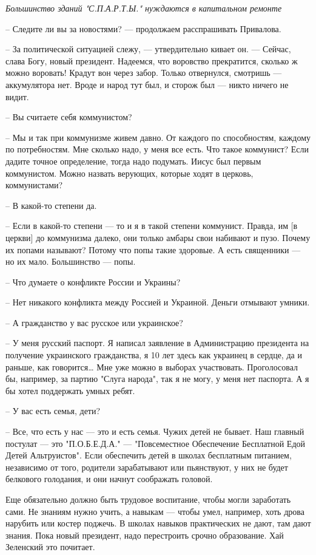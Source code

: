 \emph{Большинство зданий "С.П.А.Р.Т.Ы." нуждаются в капитальном ремонте}

– Следите ли вы за новостями? --- продолжаем расспрашивать Привалова.

– За политической ситуацией слежу, --- утвердительно кивает он. --- Сейчас, слава
Богу, новый президент. Надеемся, что воровство прекратится, сколько ж можно
воровать! Крадут вон через забор. Только отвернулся, смотришь --- аккумулятора
нет. Вроде и народ тут был, и сторож был --- никто ничего не видит.

– Вы считаете себя коммунистом?

– Мы и так при коммунизме живем давно. От каждого по способностям, каждому по
потребностям. Мне сколько надо, у меня все есть. Что такое коммунист? Если
дадите точное определение, тогда надо подумать. Иисус был первым коммунистом.
Можно назвать верующих, которые ходят в церковь, коммунистами?

– В какой-то степени да.

– Если в какой-то степени --- то и я в такой степени коммунист. Правда, им [в
церкви] до коммунизма далеко, они только амбары свои набивают и пузо. Почему их
попами называют? Потому что попы такие здоровые. А есть священники --- но их
мало. Большинство --- попы.

– Что думаете о конфликте России и Украины?

– Нет никакого конфликта между Россией и Украиной. Деньги отмывают умники.

– А гражданство у вас русское или украинское?

– У меня русский паспорт. Я написал заявление в Администрацию президента на
получение украинского гражданства, я 10 лет здесь как украинец в сердце, да и
раньше, как говорится… Мне уже можно в выборах участвовать. Проголосовал бы,
например, за партию "Слуга народа", так я не могу, у меня нет паспорта. А я бы
хотел поддержать умных ребят. 

– У вас есть семья, дети?

– Все, что есть у нас --- это и есть семья. Чужих детей не бывает. Наш главный
постулат --- это "П.О.Б.Е.Д.А." --- "Повсеместное Обеспечение Бесплатной Едой Детей
Альтруистов". Если обеспечить детей в школах бесплатным питанием, независимо от
того, родители зарабатывают или пьянствуют, у них не будет белкового голодания,
и они начнут соображать головой. 

Еще обязательно должно быть трудовое воспитание, чтобы могли заработать сами.
Не знаниям нужно учить, а навыкам --- чтобы умел, например, хоть дрова нарубить
или костер поджечь. В школах навыков практических не дают, там дают знания.
Пока новый президент, надо перестроить срочно образование. Хай Зеленский это
почитает.


